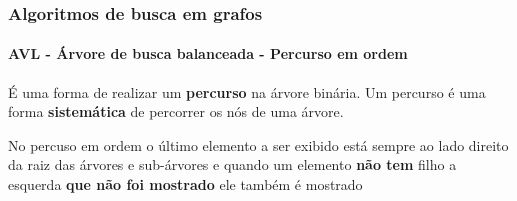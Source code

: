 \begin{frame}
	\frametitle{Algoritmos de busca em grafos}
	\framesubtitle{AVL - Árvore de busca balanceada - Percurso em ordem}
	\par É uma forma de realizar um \textbf{percurso} na árvore binária. Um percurso é uma forma \textbf{sistemática} de percorrer os nós de uma árvore.
	\par No percuso em ordem o último elemento a ser exibido está sempre ao lado direito da raiz das árvores e sub-árvores e quando um elemento \textbf{não tem} filho a esquerda \textbf{que não foi mostrado} ele também é mostrado
	
\end{frame}
